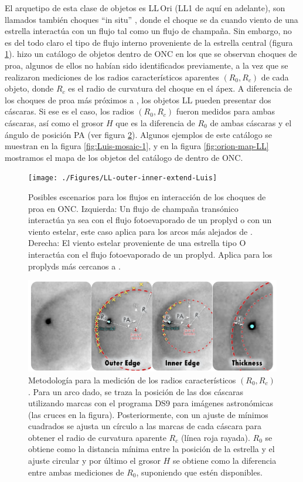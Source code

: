El arquetipo de esta clase de objetos es LL\,Ori (LL1 de aquí en adelante), son llamados también choques ``in situ'' \citep{Kobulnicky:2016}, donde el choque se da cuando viento de una estrella interactúa con un flujo tal como un flujo de champaña. Sin embargo, no es del todo claro el tipo de flujo interno proveniente de la estrella central (figura \ref{fig:LL-scheme}). \citet{Gutierrez-Soto:2015a} hizo un catálogo de objetos dentro de ONC en los que se observan choques de proa, algunos de ellos no habían sido identificados previamente, a la vez que se realizaron mediciones de los radios característicos aparentes $(R_0, R_c)$ de cada objeto, donde $R_c$ es el radio de curvatura del choque en el ápex. A diferencia de los choques de proa más próximos a \thC{}, los objetos LL pueden presentar dos cáscaras. Si ese es el caso, los radios $(R_0, R_c)$ fueron medidos para ambas cáscaras, así como el grosor $H$ que es la diferencia de $R_0$ de ambas cáscaras y el ángulo de posición PA (ver figura \ref{fig:methodology-LL}). Algunos ejemplos de este catálogo se muestran en la figura \ref{fig:Luis-mosaic-1}, y en la figura \ref{fig:orion-map-LL} mostramos el mapa de los objetos del catálogo de \citet{Gutierrez-Soto:2015a} dentro de ONC.

\begin{figure}
  \centering
  \texttt{[image: ./Figures/LL-outer-inner-extend-Luis]}
  \caption{Posibles escenarios para los flujos en interacción de los choques de proa en ONC. Izquierda: Un flujo de champaña transónico interactúa ya sea con el flujo fotoevaporado de un proplyd o con un viento estelar, este caso aplica para los arcos más alejados de \thC{}. Derecha: El viento estelar proveniente de una estrella tipo O interactúa con el flujo fotoevaporado de un proplyd. Aplica para los proplyds más cercanos a \thC{}.}
  \label{fig:LL-scheme}
\end{figure}

\begin{figure}
  \centering
  \includegraphics[width=\linewidth]{./Figures/radius-methodology-Luis}
  \caption{Metodología para la medición de los radios característicos $(R_0, R_c)$. Para un arco dado, se traza la posición de las dos cáscaras utilizando marcas con el programa DS9 para imágenes astronómicas (las cruces en la figura). Posteriormente, con un ajuste de mínimos cuadrados se ajusta un círculo a las marcas de cada cáscara para obtener el radio de curvatura aparente $R_c$ (línea roja rayada). $R_0$ se obtiene como la distancia mínima entre la posición de la estrella y el ajuste circular y por último el grosor $H$ se obtiene como la diferencia entre ambas mediciones de $R_0$, suponiendo que estén disponibles.}
  \label{fig:methodology-LL}
\end{figure}

